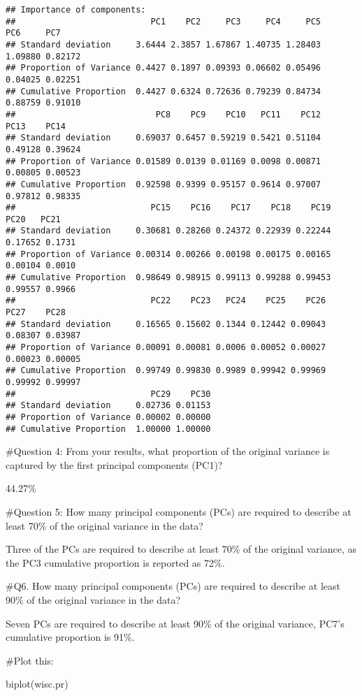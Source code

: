 \documentclass[
]{article}
\newenvironment{Shaded}{\begin{snugshade}}{\end{snugshade}}
\newcommand{\FunctionTok}[1]{\textcolor[rgb]{0.00,0.00,0.00}{#1}}
\newcommand{\NormalTok}[1]{#1}
\begin{document}
\begin{verbatim}
## Importance of components:
##                           PC1    PC2     PC3     PC4     PC5     PC6     PC7
## Standard deviation     3.6444 2.3857 1.67867 1.40735 1.28403 1.09880 0.82172
## Proportion of Variance 0.4427 0.1897 0.09393 0.06602 0.05496 0.04025 0.02251
## Cumulative Proportion  0.4427 0.6324 0.72636 0.79239 0.84734 0.88759 0.91010
##                            PC8    PC9    PC10   PC11    PC12    PC13    PC14
## Standard deviation     0.69037 0.6457 0.59219 0.5421 0.51104 0.49128 0.39624
## Proportion of Variance 0.01589 0.0139 0.01169 0.0098 0.00871 0.00805 0.00523
## Cumulative Proportion  0.92598 0.9399 0.95157 0.9614 0.97007 0.97812 0.98335
##                           PC15    PC16    PC17    PC18    PC19    PC20   PC21
## Standard deviation     0.30681 0.28260 0.24372 0.22939 0.22244 0.17652 0.1731
## Proportion of Variance 0.00314 0.00266 0.00198 0.00175 0.00165 0.00104 0.0010
## Cumulative Proportion  0.98649 0.98915 0.99113 0.99288 0.99453 0.99557 0.9966
##                           PC22    PC23   PC24    PC25    PC26    PC27    PC28
## Standard deviation     0.16565 0.15602 0.1344 0.12442 0.09043 0.08307 0.03987
## Proportion of Variance 0.00091 0.00081 0.0006 0.00052 0.00027 0.00023 0.00005
## Cumulative Proportion  0.99749 0.99830 0.9989 0.99942 0.99969 0.99992 0.99997
##                           PC29    PC30
## Standard deviation     0.02736 0.01153
## Proportion of Variance 0.00002 0.00000
## Cumulative Proportion  1.00000 1.00000
\end{verbatim}

\#Question 4: From your results, what proportion of the original
variance is captured by the first principal components (PC1)?

44.27\%

\#Question 5: How many principal components (PCs) are required to
describe at least 70\% of the original variance in the data?

Three of the PCs are required to describe at least 70\% of the original
variance, as the PC3 cumulative proportion is reported as 72\%.

\#Q6. How many principal components (PCs) are required to describe at
least 90\% of the original variance in the data?

Seven PCs are required to describe at least 90\% of the original
variance, PC7's cumulative proportion is 91\%.

\#Plot this:

\begin{Shaded}
\begin{Highlighting}[]
\FunctionTok{biplot}\NormalTok{(wisc.pr)}
\end{Highlighting}
\end{Shaded}
\end{document}
